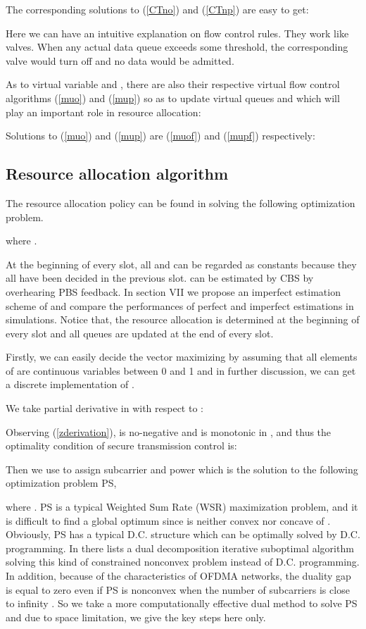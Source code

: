 \documentclass[journal]{IEEEtran}
\begin{document}
 
The corresponding solutions to (\ref{CTno}) and (\ref{CTnp}) are easy to get:
 
 


Here we can have an intuitive explanation on flow control rules. They work like valves. When  any actual data queue
exceeds some threshold, the corresponding valve would turn off and no data would be admitted.

As to virtual variable  and , there are also their respective virtual flow control algorithms
(\ref{muo}) and (\ref{mup}) so as to update virtual queues  and  which will play an important role in
resource allocation:
 

Solutions to (\ref{muo}) and (\ref{mup}) are (\ref{muof}) and (\ref{mupf}) respectively:
 


\subsection{Resource allocation algorithm}


The resource allocation policy can be found in solving the following optimization problem.

where
.

At the beginning of every slot, all  and  can be regarded as constants because they all have
been decided in the previous slot.  can be estimated by CBS by overhearing PBS feedback. In section VII we propose an
imperfect estimation scheme of  and compare the performances of perfect and imperfect estimations in simulations.
Notice that, the resource allocation is determined at the beginning of every slot and all queues are updated at the end of
every slot.

 Firstly, we can easily decide the vector  maximizing  by assuming that all elements of
  are continuous variables between 0 and 1 and  in further discussion, we can get a discrete
 implementation of .

We take partial derivative in  with respect to :

Observing (\ref{zderivation}),  is no-negative and   is monotonic in , and thus the
optimality condition of secure transmission control is:



Then we use   to assign subcarrier and power which is the solution to the following
optimization problem PS,


where . PS is a typical Weighted Sum Rate (WSR)
maximization problem,
and it is difficult to find a global optimum since  is neither convex nor concave of
. Obviously, PS has a typical D.C. structure which can be optimally solved by D.C.
programming\cite{xu2008global}.
In \cite{venturino2009coordinated} there lists a dual decomposition iterative suboptimal algorithm solving this kind of
constrained nonconvex problem instead of D.C. programming. In addition, because of the characteristics of OFDMA networks,
the duality gap is equal to zero even if PS is nonconvex  when the number of subcarriers is close to infinity
\cite{yu2006dual}. So we take a more computationally effective dual method to solve PS and due to space limitation, we
give the key steps here only. 
\end{document}
